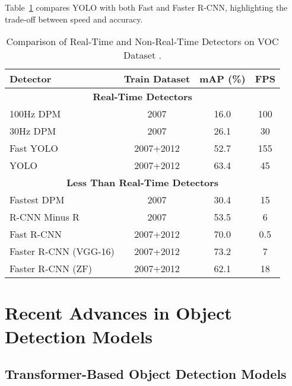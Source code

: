 \documentclass[3p,times]{elsarticle}
\begin{document}
Table~\ref{tab:yolo_performance} compares YOLO with both Fast and Faster R-CNN, highlighting the trade-off between speed and accuracy.
\begin{table}[H]
\centering
\caption{Comparison of Real-Time and Non-Real-Time Detectors on VOC Dataset \citet{redmon2016lookonceunifiedrealtime}.}
\label{tab:yolo_performance}
\begin{tabular}{|l|c|c|c|}
\hline
\textbf{Detector}                  & \textbf{Train Dataset} & \textbf{mAP (\%)} & \textbf{FPS} \\ \hline
\multicolumn{4}{|c|}{\textbf{Real-Time Detectors}}                                   \\ \hline
100Hz DPM                          & 2007                  & 16.0              & 100          \\ \hline
30Hz DPM                           & 2007                  & 26.1              & 30           \\ \hline
Fast YOLO                          & 2007+2012             & 52.7              & 155          \\ \hline
YOLO                               & 2007+2012             & 63.4              & 45           \\ \hline
\multicolumn{4}{|c|}{\textbf{Less Than Real-Time Detectors}}                         \\ \hline
Fastest DPM                        & 2007                  & 30.4              & 15           \\ \hline
R-CNN Minus R                      & 2007                  & 53.5              & 6            \\ \hline
Fast R-CNN                         & 2007+2012             & 70.0              & 0.5          \\ \hline
Faster R-CNN (VGG-16)              & 2007+2012             & 73.2              & 7            \\ \hline
Faster R-CNN (ZF)                  & 2007+2012             & 62.1              & 18           \\ \hline
\end{tabular}
\end{table}

\section{Recent Advances in Object Detection Models} \label{advances}
\subsection{Transformer-Based Object Detection Models}
\end{document}
